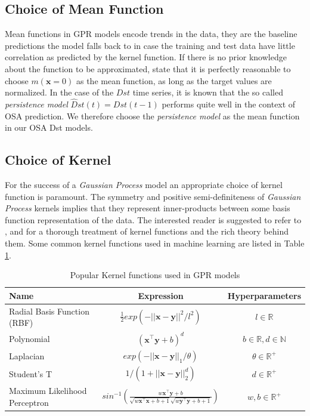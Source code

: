 \documentclass{article}
\begin{document}
\subsection{Choice of Mean Function}

Mean functions in GPR models encode trends in the data, they are the baseline predictions the model falls back to in case the training and test data have little correlation as predicted by the kernel function. If there is no prior knowledge about the function to be approximated, \citet{Rasmussen:2005:GPM:1162254} state that it is perfectly reasonable to choose $m(\mathbf{x} = 0)$ as the mean function, as long as the target values are normalized. In the case of the $Dst$ time series, it is known that the so called \emph{persistence model} $\hat{D}st(t) = Dst(t-1)$ performs quite well in the context of OSA prediction. We therefore choose the \emph{persistence model} as the mean function in our OSA Dst models.

\subsection{Choice of Kernel}

For the success of a \emph{Gaussian Process} model an appropriate choice of kernel function is paramount. The symmetry and positive semi-definiteness of \emph{Gaussian Process} kernels implies that they represent inner-products between some basis function representation of the data. The interested reader is suggested to refer to \citet{Berlinet2004}, \citet{Scholkopf:2001:LKS:559923} and \citet{hofmann2008} for a thorough treatment of kernel functions and the rich theory behind them. Some common kernel functions used in machine learning are listed in Table \ref{table:kernel}.

\begin{table}[h]
\caption{Popular Kernel functions used in GPR models}
\centering
\begin{tabular}{l c c}
\hline
 Name  & Expression & Hyperparameters  \\
\hline
  Radial Basis Function (RBF)  & $\frac{1}{2} exp(-||\mathbf{x} - \mathbf{y}||^2/l^2)$  & $l \in \mathbb{R}$   \\

  Polynomial  & $(\mathbf{x}^\intercal \mathbf{y} + b)^d$ & $b \in \mathbb{R}, d \in \mathbb{N}$   \\

  Laplacian  & $exp(-||\mathbf{x} - \mathbf{y}||_{1}/\theta)$  & $\theta \in \mathbb{R}^+$  \\

  Student's T  & $1/(1 + ||\mathbf{x} - \mathbf{y}||_{2}^d)$ & $d \in \mathbb{R}^{+}$\\

  Maximum Likelihood Perceptron  & $sin^{-1}(\frac{w\mathbf{x}^\intercal \mathbf{y} + b}{\sqrt{w\mathbf{x}^\intercal \mathbf{x} + b + 1} \sqrt{w\mathbf{y}^\intercal \mathbf{y} + b + 1}})$ & $w, b \in \mathbb{R}^{+}$\\
\hline
\end{tabular}
\label{table:kernel}
\end{table}
\end{document}
